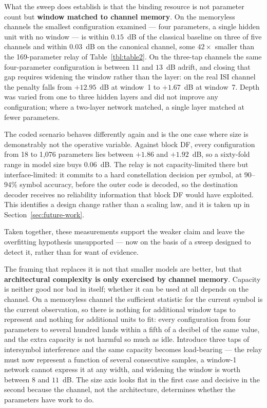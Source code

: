 What the sweep does establish is that the binding resource is not parameter count but \textbf{window matched to channel memory}. On the memoryless channels the smallest configuration examined --- four parameters, a single hidden unit with no window --- is within \(0.15\)~dB of the classical baseline on three of five channels and within \(0.03\)~dB on the canonical channel, some \(42\times\) smaller than the 169-parameter relay of Table~\ref{tbl:table2}. On the three-tap channels the same four-parameter configuration is between \(11\) and \(13\)~dB adrift, and closing that gap requires widening the window rather than the layer: on the real ISI channel the penalty falls from \(+12.95\)~dB at window~1 to \(+1.67\)~dB at window~7. Depth was varied from one to three hidden layers and did not improve any configuration; where a two-layer network matched, a single layer matched at fewer parameters.

The coded scenario behaves differently again and is the one case where size is demonstrably not the operative variable. Against block DF, every configuration from 18 to 1{,}076 parameters lies between \(+1.86\) and \(+1.92\)~dB, so a sixty-fold range in model size buys \(0.06\)~dB. The relay is not capacity-limited there but interface-limited: it commits to a hard constellation decision per symbol, at \(90\)--\(94\%\) symbol accuracy, before the outer code is decoded, so the destination decoder receives no reliability information that block DF would have exploited. This identifies a design change rather than a scaling law, and it is taken up in Section~\ref{sec:future-work}.

Taken together, these measurements support the weaker claim and leave the overfitting hypothesis unsupported --- now on the basis of a sweep designed to detect it, rather than for want of evidence.

The framing that replaces it is not that smaller models are better, but that \textbf{architectural complexity is only exercised by channel memory}. Capacity is neither good nor bad in itself; whether it can be used at all depends on the channel. On a memoryless channel the sufficient statistic for the current symbol is the current observation, so there is nothing for additional window taps to represent and nothing for additional units to fit: every configuration from four parameters to several hundred lands within a fifth of a decibel of the same value, and the extra capacity is not harmful so much as idle. Introduce three taps of intersymbol interference and the same capacity becomes load-bearing --- the relay must now represent a function of several consecutive samples, a window-1 network cannot express it at any width, and widening the window is worth between $8$ and $11$~dB. The size axis looks flat in the first case and decisive in the second because the channel, not the architecture, determines whether the parameters have work to do.

